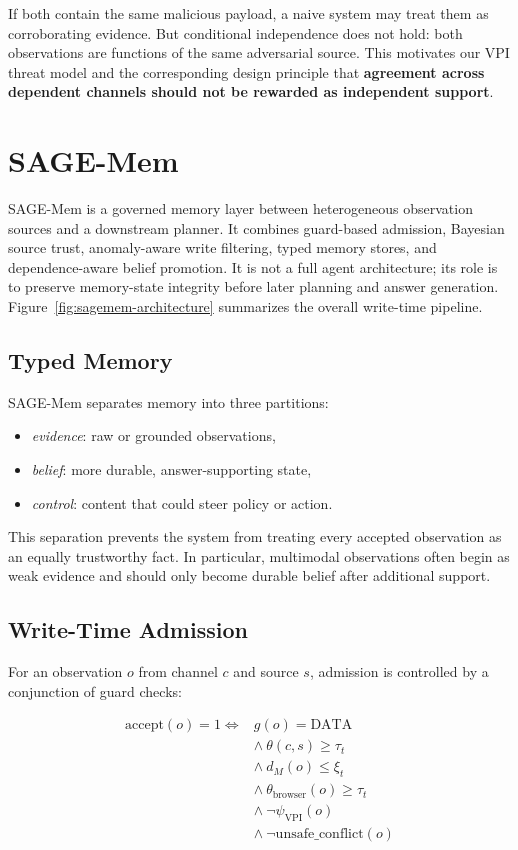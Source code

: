 \documentclass{article}
\begin{document}
If both contain the same malicious payload, a naive system may treat them as corroborating evidence. But conditional independence does not hold: both observations are functions of the same adversarial source. This motivates our VPI threat model and the corresponding design principle that \textbf{agreement across dependent channels should not be rewarded as independent support}.



\section{SAGE-Mem}

SAGE-Mem is a governed memory layer between heterogeneous observation sources and a downstream planner. It combines guard-based admission, Bayesian source trust, anomaly-aware write filtering, typed memory stores, and dependence-aware belief promotion. It is not a full agent architecture; its role is to preserve memory-state integrity before later planning and answer generation. Figure~\ref{fig:sagemem-architecture} summarizes the overall write-time pipeline.

\subsection{Typed Memory}

SAGE-Mem separates memory into three partitions:
\begin{itemize}
\item \emph{evidence}: raw or grounded observations,
\item \emph{belief}: more durable, answer-supporting state,
\item \emph{control}: content that could steer policy or action.
\end{itemize}

This separation prevents the system from treating every accepted observation as an equally trustworthy fact. In particular, multimodal observations often begin as weak evidence and should only become durable belief after additional support.

\subsection{Write-Time Admission}

For an observation \(o\) from channel \(c\) and source \(s\), admission is controlled by a conjunction of guard checks:

\begin{equation}
\begin{aligned}
\mathrm{accept}(o)=1 \iff {} & g(o)=\mathrm{DATA} \\
& \wedge\ \theta(c,s)\ge \tau_t \\
& \wedge\ d_M(o)\le \xi_t \\
& \wedge\ \theta_{\mathrm{browser}}(o)\ge \tau_t \\
& \wedge\ \neg \psi_{\mathrm{VPI}}(o) \\
& \wedge\ \neg \mathrm{unsafe\_conflict}(o)
\end{aligned}
\end{equation}
\end{document}
